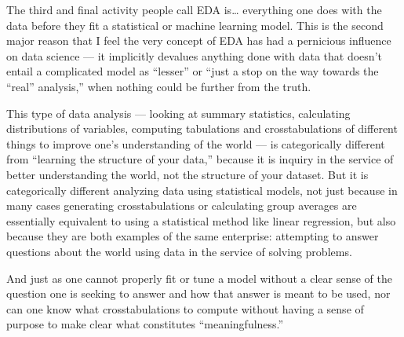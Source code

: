 \documentclass[letterpaper,10pt,english]{jupyterBook}
\begin{document}
\sphinxAtStartPar
The third and final activity people call EDA is… everything one does with the data before they fit a statistical or machine learning model. This is the second major reason that I feel the very concept of EDA has had a pernicious influence on data science — it implicitly devalues anything done with data that doesn’t entail a complicated model as “lesser” or “just a stop on the way towards the “real” analysis,” when nothing could be further from the truth.

\sphinxAtStartPar
This type of data analysis — looking at summary statistics, calculating distributions of variables, computing tabulations and cross\sphinxhyphen{}tabulations of different things to improve one’s understanding of the world — is categorically different from “learning the structure of your data,” because it is inquiry in the service of better understanding the world, not the structure of your dataset. But it is  categorically different analyzing data using statistical models, not just because in many cases generating cross\sphinxhyphen{}tabulations or calculating group averages are essentially equivalent to using a statistical method like linear regression, but also because they are both examples of the same enterprise: attempting to answer questions about the world using data in the service of solving problems.

\sphinxAtStartPar
And just as one cannot properly fit or tune a model without a clear sense of the question one is seeking to answer and how that answer is meant to be used, nor can one know what cross\sphinxhyphen{}tabulations to compute without having a sense of purpose to make clear what constitutes “meaningfulness.”
\end{document}
